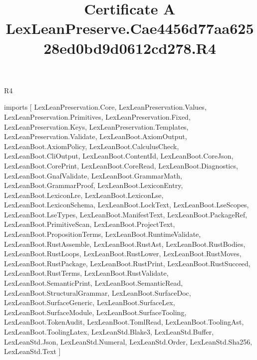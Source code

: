 \begin{lexlean}{R4}
\title{Certificate A LexLeanPreserve.Cae4456d77aa62528ed0bd9d0612cd278.R4}
\begin{coremodule}
imports [
  LexLeanPreservation.Core,
  LexLeanPreservation.Values,
  LexLeanPreservation.Primitives,
  LexLeanPreservation.Fixed,
  LexLeanPreservation.Keys,
  LexLeanPreservation.Templates,
  LexLeanPreservation.Validate,
  LexLeanBoot.AxiomOutput,
  LexLeanBoot.AxiomPolicy,
  LexLeanBoot.CalculusCheck,
  LexLeanBoot.CliOutput,
  LexLeanBoot.ContentId,
  LexLeanBoot.CoreJson,
  LexLeanBoot.CorePrint,
  LexLeanBoot.CoreRead,
  LexLeanBoot.Diagnostics,
  LexLeanBoot.GnafValidate,
  LexLeanBoot.GrammarMath,
  LexLeanBoot.GrammarProof,
  LexLeanBoot.LexiconEntry,
  LexLeanBoot.LexiconLre,
  LexLeanBoot.LexiconLse,
  LexLeanBoot.LexiconSchema,
  LexLeanBoot.LockText,
  LexLeanBoot.LseScopes,
  LexLeanBoot.LseTypes,
  LexLeanBoot.ManifestText,
  LexLeanBoot.PackageRef,
  LexLeanBoot.PrimitiveScan,
  LexLeanBoot.ProjectText,
  LexLeanBoot.PropositionTerms,
  LexLeanBoot.RuntimeValidate,
  LexLeanBoot.RustAssemble,
  LexLeanBoot.RustAst,
  LexLeanBoot.RustBodies,
  LexLeanBoot.RustLoops,
  LexLeanBoot.RustLower,
  LexLeanBoot.RustMoves,
  LexLeanBoot.RustPackage,
  LexLeanBoot.RustPrint,
  LexLeanBoot.RustSucceed,
  LexLeanBoot.RustTerms,
  LexLeanBoot.RustValidate,
  LexLeanBoot.SemanticPrint,
  LexLeanBoot.SemanticRead,
  LexLeanBoot.StructuralGrammar,
  LexLeanBoot.SurfaceDoc,
  LexLeanBoot.SurfaceGeneric,
  LexLeanBoot.SurfaceLex,
  LexLeanBoot.SurfaceModule,
  LexLeanBoot.SurfaceTooling,
  LexLeanBoot.TokenAudit,
  LexLeanBoot.TomlRead,
  LexLeanBoot.ToolingAst,
  LexLeanBoot.ToolingLatex,
  LexLeanStd.Blake3,
  LexLeanStd.Buffer,
  LexLeanStd.Json,
  LexLeanStd.Numeral,
  LexLeanStd.Order,
  LexLeanStd.Sha256,
  LexLeanStd.Text
]


\end{coremodule}
\end{lexlean}
